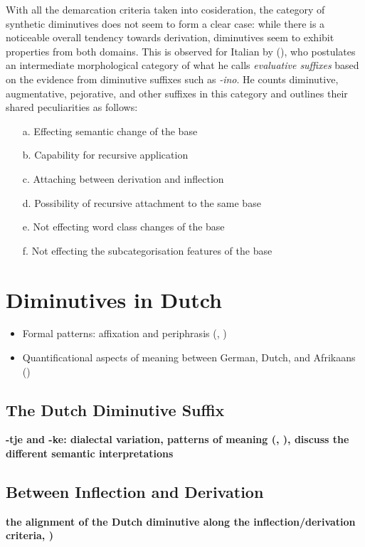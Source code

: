 With all the demarcation criteria taken into cosideration, the category of synthetic diminutives does not seem to form a clear case: while there is a noticeable overall tendency towards derivation, diminutives seem to exhibit properties from both domains. This is observed for Italian by \citeauthor{Scalise+1986} (\citeyear{Scalise+1986}), who postulates an intermediate morphological category of what he calls \textit{evaluative suffixes} based on the evidence from diminutive suffixes such as \textit{-ino}. He counts diminutive, augmentative, pejorative, and other suffixes in this category and outlines their shared peculiarities as follows:

\begin{enumerate}
\item[a.] Effecting semantic change of the base
\item[b.] Capability for recursive application
\item[c.] Attaching between derivation and inflection
\item[d.] Possibility of recursive attachment to the same base
\item[e.] Not effecting word class changes of the base
\item[f.] Not effecting the subcategorisation features of the base
\end{enumerate}



\section{Diminutives in Dutch}
\label{sec:dutchdimsuffix}
\begin{itemize}
\item Formal patterns: affixation and periphrasis (\cite{Alexiadou+Lohndal}, \cite{Schneider+2003})
\item Quantificational aspects of meaning between German, Dutch, and Afrikaans (\cite{DeBelder+2011a}) 
\end{itemize}
\subsection{The Dutch Diminutive Suffix}
\textbf{-tje and -ke: dialectal variation, patterns of meaning (\cite{VanderHulst+2008}, \cite{DeBelder+2022}), discuss the different semantic interpretations}
\subsection{Between Inflection and Derivation}
\textbf{the alignment of the Dutch diminutive along the inflection/derivation criteria, \cite{Booij+2000})}